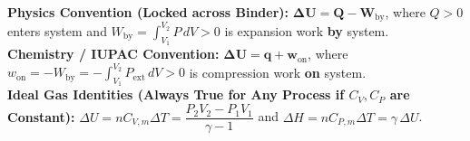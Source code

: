 \begin{quicksheet}
\label{sec:01.6}

\begin{formulacard}
\footnotesize
\textbf{Physics Convention (Locked across Binder):} $\mathbf{\Delta U = Q - W_{\mathrm{by}}}$, where $Q > 0$ enters system and $W_{\mathrm{by}} = \int_{V_1}^{V_2} P\,dV > 0$ is expansion work \textbf{by} system.\\
\textbf{Chemistry / IUPAC Convention:} $\mathbf{\Delta U = q + w_{\mathrm{on}}}$, where $w_{\mathrm{on}} = -W_{\mathrm{by}} = -\int_{V_1}^{V_2} P_{\mathrm{ext}}\,dV > 0$ is compression work \textbf{on} system.\\
\textbf{Ideal Gas Identities (Always True for Any Process if $C_V, C_P$ are Constant):} $\Delta U = n C_{V,m}\Delta T = \dfrac{P_2 V_2 - P_1 V_1}{\gamma - 1}$ and $\Delta H = n C_{P,m}\Delta T = \gamma\,\Delta U$.
\end{formulacard}


\end{quicksheet}
